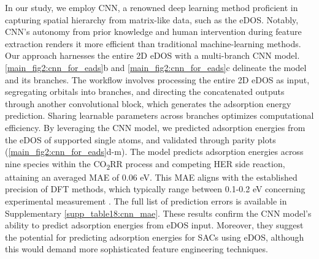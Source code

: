 \documentclass[a4paper, 12pt, titlepage]{article}
\begin{document}
    In our study, we employ CNN, a renowned deep learning method proficient in capturing spatial hierarchy from matrix-like data, such as the eDOS.
    Notably, CNN's autonomy from prior knowledge and human intervention during feature extraction renders it more efficient than traditional machine-learning methods.
    Our approach harnesses the entire 2D eDOS with a multi-branch CNN model.
    \cref{main_fig2:cnn_for_eads}b and \cref{main_fig2:cnn_for_eads}c delineate the model and its branches.
    The workflow involves processing the entire 2D eDOS as input, segregating orbitals into branches, and directing the concatenated outputs through another convolutional block, which generates the adsorption energy prediction.
    Sharing learnable parameters across branches optimizes computational efficiency.
    By leveraging the CNN model, we predicted adsorption energies from the eDOS of supported single atoms, and validated through parity plots (\cref{main_fig2:cnn_for_eads}d-m).
    The model predicts adsorption energies across nine species within the CO\textsubscript{2}RR process and competing HER side reaction, attaining an averaged MAE of 0.06 eV.
    This MAE aligns with the established precision of DFT methods, which typically range between 0.1-0.2 eV concerning experimental measurement \cite{wellendorff2015benchmark, kirklin2015open, lejaeghere2016reproducibility}.
    The full list of prediction errors is available in Supplementary \cref{supp_table18:cnn_mae}.
    These results confirm the CNN model's ability to predict adsorption energies from eDOS input.
    Moreover, they suggest the potential for predicting adsorption energies for SACs using eDOS, although this would demand more sophisticated feature engineering techniques.
\end{document}
